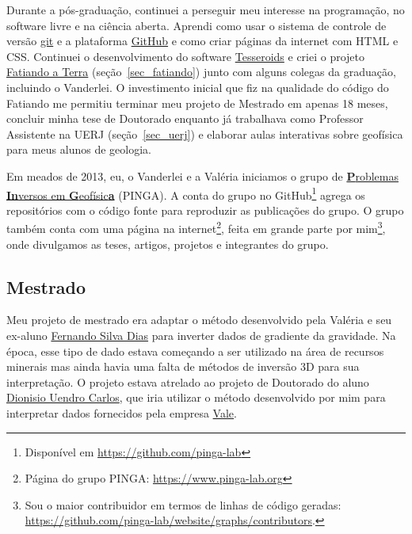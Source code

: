 \documentclass[12pt,a4paper,oneside]{book}
\begin{document}
Durante a pós-graduação, continuei a perseguir meu interesse na programação,
no software livre e na ciência aberta.
Aprendi como usar o sistema de controle de versão
\href{https://git-scm.com/}{git} e a plataforma
\href{https://github.com}{GitHub} e como criar páginas da internet com HTML e
CSS.
Continuei o desenvolvimento do software \href{https://tesseroids.leouieda.com/}{Tesseroids}
e criei o projeto \href{https://www.fatiando.org}{Fatiando a Terra}
(seção~\ref{sec_fatiando}) junto com alguns colegas da graduação, incluindo o
Vanderlei.
O investimento inicial que fiz na qualidade do código do Fatiando me
permitiu terminar meu projeto de Mestrado em apenas 18 meses,
concluir minha tese de Doutorado enquanto já trabalhava como Professor
Assistente na UERJ (seção~\ref{sec_uerj}) e elaborar aulas interativas sobre
geofísica para meus alunos de geologia.

Em meados de 2013, eu, o Vanderlei e a Valéria iniciamos o grupo de
\href{https://www.pinga-lab.org/}{\textbf{P}roblemas \textbf{In}versos em \textbf{G}eofísic\textbf{a}}
(PINGA).
A conta do grupo no GitHub\footnote{Disponível em \url{https://github.com/pinga-lab}}
agrega os repositórios com o código fonte para reproduzir as publicações do
grupo.
O grupo também conta com uma página na internet\footnote{Página do grupo PINGA: \url{https://www.pinga-lab.org}},
feita em grande parte por mim\footnote{Sou o maior contribuidor em termos de
linhas de código geradas:
\url{https://github.com/pinga-lab/website/graphs/contributors}.},
onde divulgamos as teses, artigos, projetos e integrantes do grupo.

\subsection{Mestrado}

Meu projeto de mestrado era adaptar o método desenvolvido
pela Valéria e seu ex-aluno
\href{https://www.researchgate.net/profile/Fernando-Dias-8}{Fernando Silva Dias}
\citep{SilvaDias2009} para inverter dados de gradiente da gravidade.
Na época, esse tipo de dado estava começando a ser utilizado na área de
recursos minerais mas ainda havia uma falta de métodos de inversão 3D para sua
interpretação.
O projeto estava atrelado ao projeto de Doutorado do aluno
\href{https://www.linkedin.com/in/dionisio-uendro-carlos-093671225/}{Dionisio Uendro Carlos},
que iria utilizar o método desenvolvido por mim para interpretar dados
fornecidos pela empresa \href{https://vale.com/}{Vale}.
\end{document}
